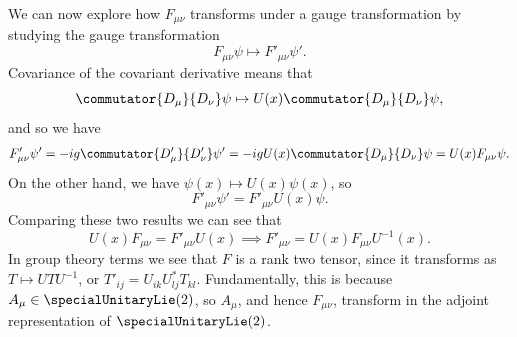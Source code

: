 \documentclass[fleqn]{NotesClass}
\newcommand{\covariantDerivative}{D}
\begin{document}
    
    We can now explore how \(F_{\mu\nu}\) transforms under a gauge transformation by studying the gauge transformation
    \begin{equation}
        F_{\mu\nu}\psi \mapsto F'_{\mu\nu}\psi'.
    \end{equation}
    Covariance of the covariant derivative means that
    \begin{equation}
        \commutator{\covariantDerivative_\mu}{\covariantDerivative_\nu}\psi \mapsto U(x)\commutator{\covariantDerivative_\mu}{\covariantDerivative_\nu}\psi,
    \end{equation}
    and so we have
    \begin{equation}
        F'_{\mu\nu}\psi' = -ig\commutator{\covariantDerivative_\mu'}{\covariantDerivative_\nu'}\psi' = -igU(x)\commutator{\covariantDerivative_\mu}{\covariantDerivative_\nu}\psi = U(x)F_{\mu\nu}\psi.
    \end{equation}
    On the other hand, we have \(\psi(x) \mapsto U(x)\psi(x)\), so
    \begin{equation}
        F'_{\mu\nu}\psi' = F'_{\mu\nu}U(x)\psi.
    \end{equation}
    Comparing these two results we can see that
    \begin{equation}
        U(x)F_{\mu\nu} = F'_{\mu\nu}U(x) \implies F'_{\mu\nu} = U(x)F_{\mu\nu}U^{-1}(x).
    \end{equation}
    In group theory terms we see that \(F\) is a rank two tensor, since it transforms as \(T \mapsto UTU^{-1}\), or \(T'_{ij} = U_{ik}U_{lj}^*T_{kl}\).
    Fundamentally, this is because \(A_\mu \in \specialUnitaryLie(2)\), so \(A_\mu\), and hence \(F_{\mu\nu}\), transform in the adjoint representation of \(\specialUnitaryLie(2)\).
    
\end{document}
